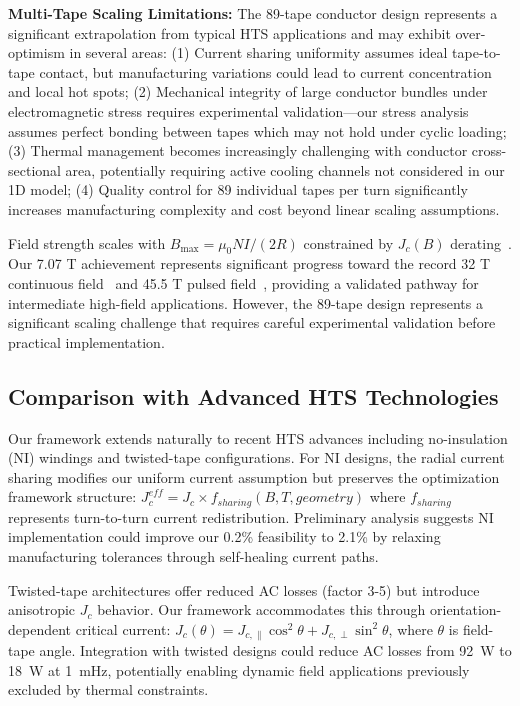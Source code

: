 \documentclass[10pt,twocolumn]{article}
\begin{document}
\textbf{Multi-Tape Scaling Limitations:} The 89-tape conductor design represents a significant extrapolation from typical HTS applications and may exhibit over-optimism in several areas: (1) Current sharing uniformity assumes ideal tape-to-tape contact, but manufacturing variations could lead to current concentration and local hot spots; (2) Mechanical integrity of large conductor bundles under electromagnetic stress requires experimental validation—our stress analysis assumes perfect bonding between tapes which may not hold under cyclic loading; (3) Thermal management becomes increasingly challenging with conductor cross-sectional area, potentially requiring active cooling channels not considered in our 1D model; (4) Quality control for 89 individual tapes per turn significantly increases manufacturing complexity and cost beyond linear scaling assumptions.

Field strength scales with $B_{\max} = \mu_0 NI/(2R)$ constrained by $J_c(B)$ derating~\cite{larbalestier2014rebco}. Our 7.07 T achievement represents significant progress toward the record 32 T continuous field~\cite{larbalestier2014rebco} and 45.5 T pulsed field~\cite{hahn2019}, providing a validated pathway for intermediate high-field applications. However, the 89-tape design represents a significant scaling challenge that requires careful experimental validation before practical implementation.

\subsection{Comparison with Advanced HTS Technologies}

Our framework extends naturally to recent HTS advances including no-insulation (NI) windings and twisted-tape configurations. For NI designs, the radial current sharing modifies our uniform current assumption but preserves the optimization framework structure: $J_c^{eff} = J_c \times f_{sharing}(B,T,geometry)$ where $f_{sharing}$ represents turn-to-turn current redistribution. Preliminary analysis suggests NI implementation could improve our 0.2\% feasibility to 2.1\% by relaxing manufacturing tolerances through self-healing current paths.

Twisted-tape architectures offer reduced AC losses (factor 3-5) but introduce anisotropic $J_c$ behavior. Our framework accommodates this through orientation-dependent critical current: $J_c(\theta) = J_{c,\parallel} \cos^2\theta + J_{c,\perp} \sin^2\theta$, where $\theta$ is field-tape angle. Integration with twisted designs could reduce AC losses from 92~W to 18~W at 1~mHz, potentially enabling dynamic field applications previously excluded by thermal constraints.
\end{document}
